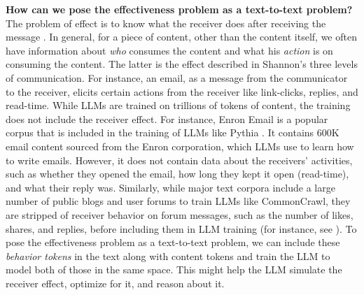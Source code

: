 \textbf{How can we pose the effectiveness problem as a text-to-text problem?} The problem of effect is to know what the receiver does after receiving the message \citep{shannon-weaver-1949}. In general, for a piece of content, other than the content itself, we often have information about \textit{who} consumes the content and what his \textit{action} is on consuming the content. The latter is the effect described in Shannon's three levels of communication. For instance, an email, as a message from the communicator to the receiver, elicits certain actions from the receiver like link-clicks, replies, and read-time. While LLMs are trained on trillions of tokens of content, the training does not include the receiver effect. For instance, Enron Email \citep{klimt2004enron} is a popular corpus that is included in the training of LLMs like Pythia \citep{biderman2023pythia}. It contains 600K email content sourced from the Enron corporation, which LLMs use to learn how to write emails. However, it does not contain data about the receivers' activities, such as whether they opened the email, how long they kept it open (read-time), and what their reply was. Similarly, while major text corpora include a large number of public blogs and user forums to train LLMs like CommonCrawl, they are stripped of receiver behavior on forum messages, such as the number of likes, shares, and replies, before including them in LLM training (for instance, see \citep{biderman2022datasheet,penedo2023refinedweb}). 
To pose the effectiveness problem as a text-to-text problem, we can include these \textit{behavior tokens} in the text along with content tokens and train the LLM to model both of those in the same space. This might help the LLM simulate the receiver effect, optimize for it, and reason about it. 



